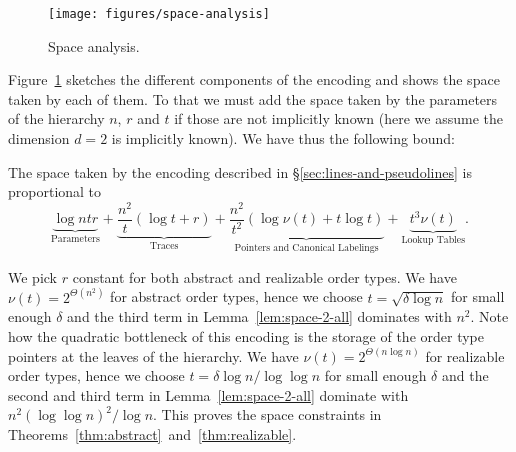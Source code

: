 
\ifeurocg\else%
\begin{figure}
  \centering{}
  \texttt{[image: figures/space-analysis]}
  \caption{Space analysis.}\label{fig:space-analysis}
\end{figure}
\fi

Figure~\ref{fig:space-analysis} sketches the different components of the
encoding and shows the space taken by each of them.
To that we must add the space taken by the
parameters of the hierarchy \(n\), \(r\) and \(t\) if those are not implicitly
known (here we assume the dimension \(d=2\) is implicitly known).
We have thus the following bound:
%
\begin{lemma}\label{lem:space-2-all}
  The space taken by the encoding described in \S\ref{sec:lines-and-pseudolines} is
  proportional to
    \begin{displaymath}
      \underbrace{\log ntr}_{\text{Parameters}}
      +
      \underbrace{\frac{n^2}{t} ( \log t + r )}_{\text{Traces}}
      +
      \underbrace{\frac{n^2}{t^2} ( \log \nu(t) + t \log t)}_{\text{Pointers and Canonical Labelings}}
      +
      \underbrace{t^3 \nu(t)}_{\text{Lookup Tables}}.
    \end{displaymath}
\end{lemma}

We pick \(r\) constant for both abstract and realizable order types.
%
We have \(\nu(t) = 2^{\Theta(n^2)}\) for abstract order types, hence we
choose \(t = \sqrt{\delta \log n}\) for small enough \(\delta\) and the third
term in Lemma~\ref{lem:space-2-all} dominates with \(n^2\). Note how the
quadratic bottleneck of this encoding is the storage of the order type pointers
at the leaves of the hierarchy.
%
We have \(\nu(t) = 2^{\Theta(n \log n)}\) for realizable order types, hence we
choose \(t = \delta \log n / \log \log n\) for small enough \(\delta\) and the
second and third term in Lemma~\ref{lem:space-2-all} dominate with \(n^2 {(\log
\log n)}^2 / \log n\). This proves the space constraints in
Theorems~\ref{thm:abstract}~and~\ref{thm:realizable}.

